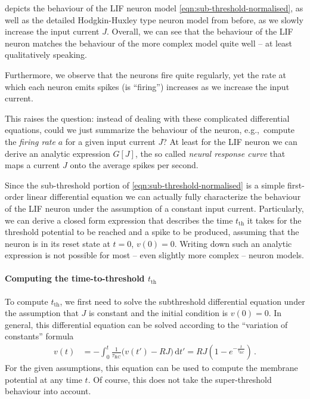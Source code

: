\documentclass[10pt,letterpaper,oneside]{article}
\begin{document}
 depicts the behaviour of the LIF neuron model \cref{eqn:sub-threshold-normalised}, as well as the detailed Hodgkin-Huxley type neuron model from before, as we slowly increase the input current $J$. Overall, we can see that the behaviour of the LIF neuron matches the behaviour of the more complex model quite well -- at least qualitatively speaking.

Furthermore, we observe that the neurons fire quite regularly, yet the rate at which each neuron emits spikes (is \enquote{firing}) increases as we increase the input current.

This raises the question: instead of dealing with these complicated differential equations, could we just summarize the behaviour of the neuron, e.g.,~compute the \emph{firing rate} $a$ for a given input current $J$? At least for the LIF neuron we can derive an analytic expression $G[J]$, the so called \emph{neural response curve} that maps a current $J$ onto the average spikes per second.

\newpage


Since the sub-threshold portion of \cref{eqn:sub-threshold-normalised} is a simple first-order linear differential equation we can actually fully characterize the behaviour of the LIF neuron under the assumption of a constant input current. Particularly, we can derive a closed form expression that describes the time $t_\mathrm{th}$ it takes for the threshold potential to be reached and a spike to be produced, assuming that the neuron is in its reset state at $t=0$, $v(0) = 0$. Writing down such an analytic expression is not possible for most -- even slightly more complex -- neuron models.

\paragraph{Computing the time-to-threshold $t_\mathrm{th}$}
To compute $t_\mathrm{th}$, we first need to solve the subthreshold differential equation under the assumption that $J$ is constant and the initial condition is $v(0) = 0$. In general, this differential equation can be solved according to the \enquote{variation of constants} formula
\begin{align*}
	v(t) &= - \int_0^t \frac{1}{\tau_\mathrm{RC}} \big( v(t') - RJ \big) \,\mathrm{d}t'
	      = RJ \left(1 - e^{-\frac{t}{\tau_\mathrm{RC}}} \right) \,.
\end{align*}
For the given assumptions, this equation can be used to compute the membrane potential at any time $t$. Of course, this does not take the super-threshold behaviour into account.
\end{document}
